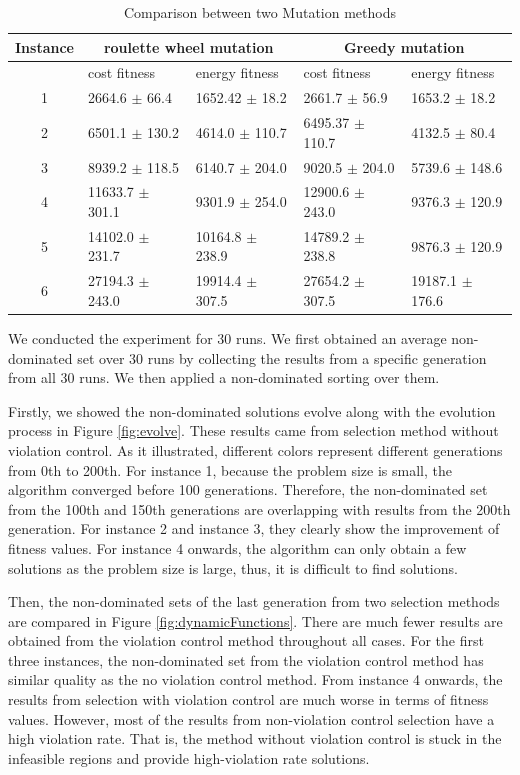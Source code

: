 \begin{table}[!ht]
\centering
\caption{Comparison between two Mutation methods}
\label{tab:mutations}
\begin{tabular}{@{}cllll@{}}
\toprule
Instance & \multicolumn{2}{c}{roulette wheel mutation} & \multicolumn{2}{c}{Greedy mutation}   \\ \midrule
        & cost fitness         & energy fitness       & cost fitness      & energy fitness    \\
1       & 2664.6 $\pm$ 66.4      & 1652.42 $\pm$ 18.2     & 2661.7 $\pm$ 56.9   & 1653.2 $\pm$ 18.2   \\
2       & 6501.1 $\pm$ 130.2     & 4614.0 $\pm$ 110.7     & 6495.37 $\pm$ 110.7 & 4132.5 $\pm$ 80.4   \\
3       & 8939.2 $\pm$ 118.5     & 6140.7 $\pm$ 204.0     & 9020.5 $\pm$ 204.0  & 5739.6 $\pm$ 148.6  \\
4       & 11633.7 $\pm$ 301.1    & 9301.9 $\pm$ 254.0     & 12900.6 $\pm$ 243.0 & 9376.3 $\pm$ 120.9  \\
5       & 14102.0 $\pm$ 231.7    & 10164.8 $\pm$ 238.9    & 14789.2 $\pm$ 238.8 & 9876.3 $\pm$ 120.9  \\
6       & 27194.3 $\pm$ 243.0    & 19914.4 $\pm$ 307.5    & 27654.2 $\pm$ 307.5 & 19187.1 $\pm$ 176.6 \\ \bottomrule
\end{tabular}
\end{table}

We conducted the experiment for 30 runs. We first obtained an average non-dominated set over 30 runs by collecting the results from a specific generation from all 30 runs. We then applied a non-dominated sorting over them.

Firstly, we showed the non-dominated solutions evolve along with the evolution process in Figure \ref{fig:evolve}.
These results came from selection method without violation control. 
As it illustrated, different colors represent different generations from 0th to 200th. 
For instance 1, because the problem size is small, the algorithm converged before 100 generations. Therefore, the non-dominated set from the 100th and 150th generations are overlapping with results from the 200th generation. For instance 2 and instance 3, they clearly show the improvement of fitness values. For instance 4 onwards, the algorithm can only obtain a few solutions as the problem size is large, thus, it is difficult to find solutions.

Then, the non-dominated sets of the last generation from two selection methods are compared in Figure \ref{fig:dynamicFunctions}. There are much fewer results are obtained from the violation control method throughout all cases. For the first three instances, the non-dominated set from the violation control method has similar quality
as the no violation control method. From instance 4 onwards, the results from selection with violation control are much worse in terms of fitness values. However, most of the results from non-violation control selection have a high violation rate. That is, the method without violation control is stuck in the infeasible regions and provide high-violation rate solutions. 

